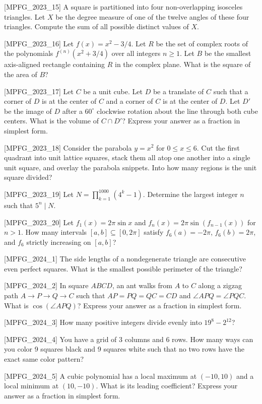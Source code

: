 [MPFG_2023_15]
A square is partitioned into four non-overlapping isosceles triangles. Let $X$ be the degree measure of one of the twelve angles of these four triangles. Compute the sum of all possible distinct values of $X$.

[MPFG_2023_16]
Let $f(x) = x^2 - 3/4$. Let $R$ be the set of complex roots of the polynomials $f^{(n)}(x^2 + 3/4)$ over all integers $n \ge 1$. Let $B$ be the smallest axis-aligned rectangle containing $R$ in the complex plane. What is the square of the area of $B$?

[MPFG_2023_17]
Let $C$ be a unit cube. Let $D$ be a translate of $C$ such that a corner of $D$ is at the center of $C$ and a corner of $C$ is at the center of $D$. Let $D'$ be the image of $D$ after a $60^\circ$ clockwise rotation about the line through both cube centers. What is the volume of $C \cap D'$? Express your answer as a fraction in simplest form.

[MPFG_2023_18]
Consider the parabola $y=x^2$ for $0 \le x \le 6$. Cut the first quadrant into unit lattice squares, stack them all atop one another into a single unit square, and overlay the parabola snippets. Into how many regions is the unit square divided?

[MPFG_2023_19]
Let $N = \prod_{k=1}^{1000} (4^k - 1)$. Determine the largest integer $n$ such that $5^n \mid N$.

[MPFG_2023_20]
Let $f_1(x) = 2\pi\sin x$ and $f_n(x) = 2\pi\sin(f_{n-1}(x))$ for $n > 1$. How many intervals $[a, b] \subseteq [0, 2\pi]$ satisfy $f_6(a) = -2\pi$, $f_6(b) = 2\pi$, and $f_6$ strictly increasing on $[a, b]$?

[MPFG_2024_1]
The side lengths of a nondegenerate triangle are consecutive even perfect squares. What is the smallest possible perimeter of the triangle?

[MPFG_2024_2]
In square $ABCD$, an ant walks from $A$ to $C$ along a zigzag path $A \to P \to Q \to C$ such that $AP = PQ = QC = CD$ and $\angle APQ = \angle PQC$. What is $\cos(\angle APQ)$? Express your answer as a fraction in simplest form.

[MPFG_2024_3]
How many positive integers divide evenly into $19^8 - 2^{12}$?

[MPFG_2024_4]
You have a grid of 3 columns and 6 rows. How many ways can you color 9 squares black and 9 squares white such that no two rows have the exact same color pattern?

[MPFG_2024_5]
A cubic polynomial has a local maximum at $(-10, 10)$ and a local minimum at $(10, -10)$. What is its leading coefficient? Express your answer as a fraction in simplest form.

